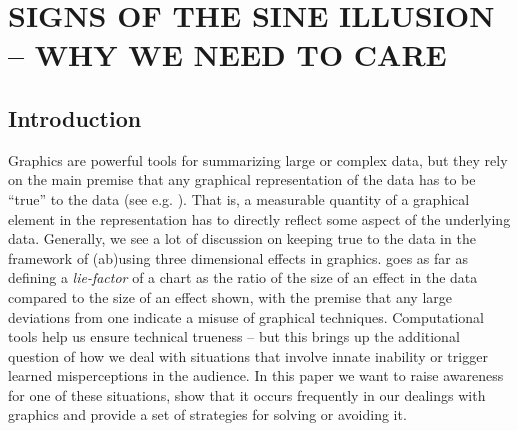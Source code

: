 \documentclass[11pt]{isuthesis}\usepackage[]{graphicx}\usepackage[]{color}
\begin{document}
\graphicspath{{Figure/sineIllusion/}{Images/sineIllusion/}}
\renewcommand{\floatpagefraction}{.99}

\newcommand{\range}[1]{{\text{range}\left(#1\right)}}
\newcommand{\s}[2]{{_{#1}s^{ #2}}}
\newcommand{\atan}[1]{\text{atan}\left({#1}\right)}
\newcommand{\xR}{\mathbb{R}}








\chapter{SIGNS OF THE SINE ILLUSION -- WHY WE NEED TO CARE}\label{SineIllusionChapter}\label{sineillusion}


\section{Introduction}
Graphics are powerful tools for summarizing large or complex data, but they rely on the main premise that any graphical representation of the data has to be ``true'' to the data (see e.g. \citet{tufte, wainer:2000, robbins:2005}). That is, a measurable quantity of a graphical element in the representation has to  directly reflect some aspect of the underlying data. Generally, we see a lot of discussion on keeping true to the data in the framework of (ab)using three dimensional effects in graphics. \cite{tufte} goes as far as defining a {\it lie-factor} of a chart as the ratio of the size of an effect in the data compared to the size of an effect shown, with the premise that any large deviations from one indicate a misuse of graphical techniques. Computational tools help us ensure technical trueness -- but this brings up the additional question of how we deal with situations that involve innate inability or trigger learned misperceptions in the audience. In this paper we want to raise awareness for one of these situations, show that it occurs frequently in our dealings with graphics and provide a set of strategies for solving or avoiding it.
\end{document}
